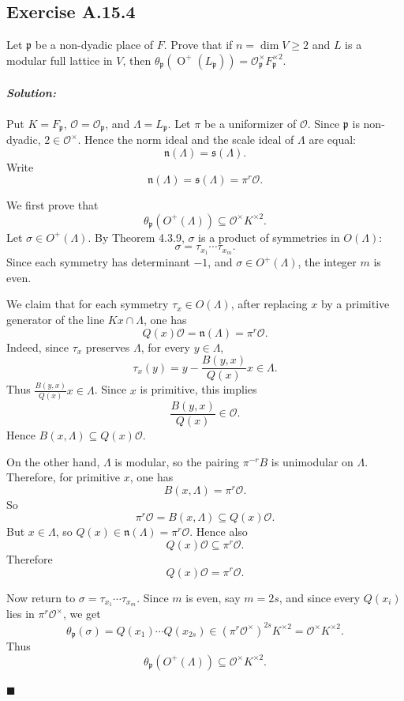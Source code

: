 \documentclass[12pt, a4paper]{article}
\newenvironment{solution}
  {\paragraph{\textit{Solution:}}\par\medskip}
  {\hfill$\blacksquare$\vspace{0.1cm}}
\begin{document}
\subsection*{Exercise A.15.4}
Let $\mathfrak{p}$ be a non-dyadic place of $F$. Prove that if $n = \dim V \ge 2$ and $L$ is a modular full lattice in $V$, then $\theta_{\mathfrak{p}}(\operatorname{O}^+(L_{\mathfrak{p}})) = \mathcal{O}_{\mathfrak{p}}^\times F_{\mathfrak{p}}^{\times 2}$.
\begin{solution}
Put \(K=F_{\mathfrak p}\), \(\mathcal O=\mathcal O_{\mathfrak p}\), and
\(\Lambda=L_{\mathfrak p}\). Let \(\pi\) be a uniformizer of \(\mathcal O\).
Since \(\mathfrak p\) is non-dyadic, \(2\in\mathcal O^\times\). Hence the norm
ideal and the scale ideal of \(\Lambda\) are equal:
\[
\mathfrak n(\Lambda)=\mathfrak s(\Lambda).
\]
Write
\[
\mathfrak n(\Lambda)=\mathfrak s(\Lambda)=\pi^r\mathcal O.
\]

We first prove that
\[
\theta_{\mathfrak p}(O^+(\Lambda))
\subseteq \mathcal O^\times K^{\times 2}.
\]
Let \(\sigma\in O^+(\Lambda)\). By Theorem 4.3.9, \(\sigma\) is a product of
symmetries in \(O(\Lambda)\):
\[
\sigma=\tau_{x_1}\cdots \tau_{x_m}.
\]
Since each symmetry has determinant \(-1\), and \(\sigma\in O^+(\Lambda)\), the
integer \(m\) is even.

We claim that for each symmetry \(\tau_x\in O(\Lambda)\), after replacing \(x\)
by a primitive generator of the line \(Kx\cap\Lambda\), one has
\[
Q(x)\mathcal O=\mathfrak n(\Lambda)=\pi^r\mathcal O.
\]
Indeed, since \(\tau_x\) preserves \(\Lambda\), for every \(y\in\Lambda\),
\[
\tau_x(y)=y-\frac{B(y,x)}{Q(x)}x\in \Lambda.
\]
Thus \(\frac{B(y,x)}{Q(x)}x\in\Lambda\). Since \(x\) is primitive, this implies
\[
\frac{B(y,x)}{Q(x)}\in\mathcal O.
\]
Hence \(B(x,\Lambda)\subseteq Q(x)\mathcal O\).

On the other hand, \(\Lambda\) is modular, so the pairing
\(\pi^{-r}B\) is unimodular on \(\Lambda\). Therefore, for primitive \(x\), one
has
\[
B(x,\Lambda)=\pi^r\mathcal O.
\]
So
\[
\pi^r\mathcal O=B(x,\Lambda)\subseteq Q(x)\mathcal O.
\]
But \(x\in\Lambda\), so \(Q(x)\in\mathfrak n(\Lambda)=\pi^r\mathcal O\). Hence
also
\[
Q(x)\mathcal O\subseteq \pi^r\mathcal O.
\]
Therefore
\[
Q(x)\mathcal O=\pi^r\mathcal O.
\]

Now return to \(\sigma=\tau_{x_1}\cdots\tau_{x_m}\). Since \(m\) is even, say
\(m=2s\), and since every \(Q(x_i)\) lies in \(\pi^r\mathcal O^\times\), we get
\[
\theta_{\mathfrak p}(\sigma)
=Q(x_1)\cdots Q(x_{2s})
\in (\pi^r\mathcal O^\times)^{2s}K^{\times 2}
=\mathcal O^\times K^{\times 2}.
\]
Thus
\[
\theta_{\mathfrak p}(O^+(\Lambda))
\subseteq \mathcal O^\times K^{\times 2}.
\]


\end{solution}
\end{document}

